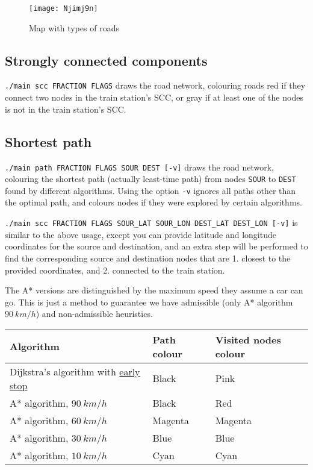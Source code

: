 \begin{figure}[H]
    \centering
    \texttt{[image: Njimj9n]}
    \caption{Map with types of roads}
\end{figure}

\subsection{Strongly connected components}
\texttt{./main scc FRACTION FLAGS} draws the road network, colouring roads red if they connect two nodes in the train station's \acrshort{SCC}, or gray if at least one of the nodes is not in the train station's \acrshort{SCC}.
\subsection{Shortest path}
\texttt{./main path FRACTION FLAGS SOUR DEST [-v]} draws the road network, colouring the shortest path (actually least-time path) from nodes \texttt{SOUR} to \texttt{DEST} found by different algorithms. Using the option \texttt{-v} ignores all paths other than the optimal path, and colours nodes if they were explored by certain algorithms.\par

\texttt{./main scc FRACTION FLAGS SOUR\_LAT SOUR\_LON DEST\_LAT DEST\_LON [-v]} is similar to the above usage, except you can provide latitude and longitude coordinates for the source and destination, and an extra step will be performed to find the corresponding source and destination nodes that are 1. closest to the provided coordinates, and 2. connected to the train station.\par

The A* versions are distinguished by the maximum speed they assume a car can go. This is just a method to guarantee we have admissible (only A* algorithm $\SI{90}{km/h}$) and non-admissible heuristics.
\begin{center}
    \begin{tabular}{l | l | l}
        \textbf{Algorithm}            & \textbf{Path colour} & \textbf{Visited nodes colour} \\ \hline
        Dijkstra's algorithm with \hyperref[alg:dijkstra-early-stop]{early stop} & Black                & Pink                          \\
        A* algorithm, $\SI{90}{km/h}$ & Black                & Red                           \\
        A* algorithm, $\SI{60}{km/h}$ & Magenta              & Magenta                       \\
        A* algorithm, $\SI{30}{km/h}$ & Blue                 & Blue                          \\
        A* algorithm, $\SI{10}{km/h}$ & Cyan                 & Cyan                          
    \end{tabular}
\end{center}

